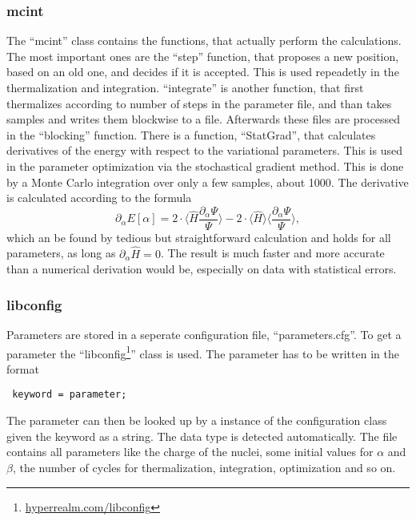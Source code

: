 \documentclass[a4paper,10pt]{article}
\begin{document}
\subsubsection{mcint}

The ``mcint'' class contains the functions, that actually perform the calculations. 
The most important ones are the ``step'' function, that proposes a new position, based on an old one, and decides if it is accepted. 
This is used repeadetly in the thermalization and integration. 
``integrate'' is another function, that first thermalizes according to number of steps in the parameter file, and than takes samples 
and writes them blockwise to a file. 
Afterwards these files are processed in the ``blocking'' function. 
There is a function, ``StatGrad'', that calculates derivatives of the energy with respect to the variational parameters. This is used in the
parameter optimization via the stochastical gradient method. This is done by a Monte Carlo integration over only a few samples, about 1000.
The derivative is calculated according to the formula
\begin{equation}
 \partial_{\alpha} E[\alpha] = 2 \cdot \Big\langle \hat{H} \frac{\partial_{\alpha} \Psi}{\Psi} \Big\rangle 
			       -2\cdot \Big\langle \hat{H} \Big\rangle \Big\langle \frac{\partial_{\alpha} \Psi}{\Psi} \Big\rangle,
\end{equation}
which an be found by tedious but straightforward calculation and holds for all parameters, as long as $\partial_{\alpha}\hat{H} =0$.
The result is much faster and more accurate than a numerical derivation would be, especially on
data with statistical errors. 




\subsubsection{libconfig}

Parameters are stored in a seperate configuration file, ``parameters.cfg''. 
To get a parameter the ``libconfig\footnote{\href{http://www.hyperrealm.com/libconfig/}{hyperrealm.com/libconfig}}'' class is used. The parameter has to be written in the format
\begin{lstlisting}
 keyword = parameter;
\end{lstlisting}
The parameter can then be looked up by a instance of the configuration class given the keyword as a string. The data type is detected automatically. 
The file contains all parameters like the charge of the nuclei, some initial values for $\alpha$ and $\beta$, 
the number of cycles for thermalization, integration, optimization and so on. 
\end{document}
